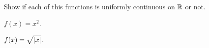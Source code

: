 \begin{problem}
  Show if each of this functions is uniformly continuous on $\mathbb{R}$ or not.
  \begin{enumroman}
    \item $f(x) = x^2$.
      \begin{answer}

      \end{answer}
    \item $f(x) = \sqrt{\lvert x\rvert}$.
      \begin{answer}

      \end{answer}
  \end{enumroman}
\end{problem}
